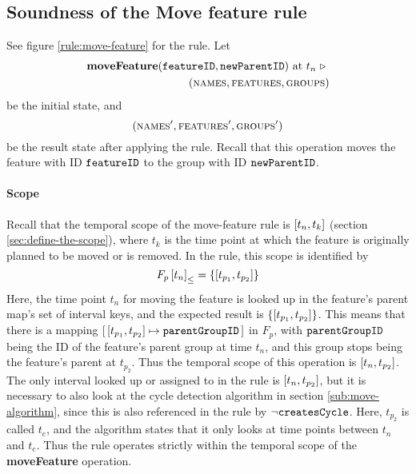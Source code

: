 \subsection{Soundness of the Move feature rule}
\label{sub:soundness-of-the-move-reature-rule}

See figure \vref{rule:move-feature} for the  rule. Let 
\begin{equation*}
   \begin{split}
      \textbf{moveFeature}(\texttt{featureID}, \texttt{newParentID}) \text{ at } t_n \ \triangleright \  \\
      (\textsc{names}, \textsc{features}, \textsc{groups}{})
   \end{split}
\end{equation*}
be the initial state, and
\[
   (\textsc{names}', \textsc{features}', \textsc{groups}{}')
\]
be the result state after applying the  rule. Recall that this operation moves the feature with ID $\texttt{featureID}$ to the group with ID $\texttt{newParentID}$.

\paragraph{Scope}
Recall that the temporal scope of the move-feature rule is $\interval{t_n}{t_k}$ (section \vref{sec:define-the-scope}), where $t_k$ is the time point at which the feature is originally planned to be moved or is removed. In the rule, this scope is identified by 
   \[
      \containing{F_p}{t_n} = \set{\interval{t_{p_1}}{t_{p_2}}}
   \]
   Here, the time point $t_n$ for moving the feature is looked up in the feature's parent map's set of interval keys, and the expected result is $\set{\interval{t_{p_1}}{t_{p_2}}}$. This means that there is a mapping $\intervalmapping{t_{p_1}}{t_{p_2}}{\var{parentGroupID}}$ in $F_p$, with $\texttt{parentGroupID}$ being the ID of the feature's parent group at time $t_n$, and this group stops being the feature's parent at $t_{p_2}$. Thus the temporal scope of this operation is $\interval{t_n}{t_{p_2}}$. The only interval looked up or assigned to in the rule is $\interval{t_n}{t_{p_2}}$, but it is necessary to also look at the cycle detection algorithm in section \vref{sub:move-algorithm}, since this is also referenced in the rule by $\neg \texttt{createsCycle}$. Here, $t_{p_2}$ is called $t_e$, and the algorithm states that it only looks at time points between $t_n$ and $t_e$. Thus the rule operates strictly within the temporal scope of the \textbf{moveFeature} operation.


